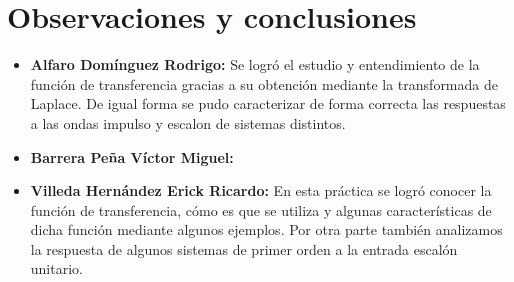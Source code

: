 \section{Observaciones y conclusiones}

\begin{itemize}
	\item \textbf{Alfaro Domínguez Rodrigo:}
	Se logró el estudio y entendimiento de la función de transferencia gracias a su obtención mediante la transformada de Laplace. De igual forma se pudo caracterizar de forma correcta las respuestas a las ondas impulso y escalon de sistemas distintos.
	\item \textbf{Barrera Peña Víctor Miguel:}
	\item \textbf{Villeda Hernández Erick Ricardo:}
	En esta práctica se logró conocer la función de transferencia, cómo es que se utiliza y algunas características de dicha función mediante algunos ejemplos. Por otra parte también analizamos la respuesta de algunos sistemas de primer orden a la entrada escalón unitario.
\end{itemize}